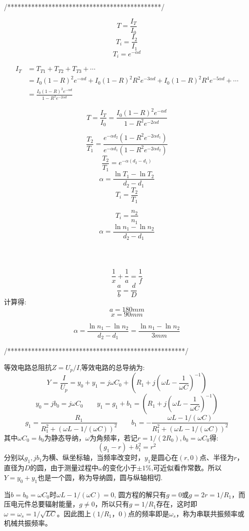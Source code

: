 \documentclass[UTF8]{article}
\begin{document}
{	/*********************************************/
	
	$$T = \frac{I_T}{I_0}$$
	$$T_i = \frac{I_2}{I_1}$$
	$$T_i = e^{-\alpha d}$$
	
	\begin{equation}
	\begin{aligned}
	I_T &= T_{T1} + T_{T2} + T_{T3}+\cdots\\ &= I_0(1-R)^2e^{-\alpha d} + I_0(1-R)^2R^2e^{-3\alpha d}+I_0(1-R)^2R^4e^{-5\alpha d}+\cdots\\ &= \frac{I_0(1-R)^2e^{-\alpha d}}{1-R^2e^{-2\alpha d}}
	\end{aligned}
	\end{equation}
	
	$$T = \frac{I_T}{I_0} = \frac{I_0(1-R)^2e^{-\alpha d}}{1-R^2e^{-2\alpha d}}$$
	
	$$\frac{T_2}{T_1} = \frac{e^{-\alpha d_2}(1-R^2e^{-2\alpha d_1})}{e^{-\alpha d_1}(1-R^2e^{-2\alpha d_2})}$$
	$$\frac{T_2}{T_1} = e^{-\alpha(d_2-d_1)}$$
	$$\alpha = \frac{\ln T_1 - \ln T_2}{d_2 - d_1}$$
	$$T_i = \frac{T_2}{T_1}$$
	
	$$T_i = \frac{n_2}{n_1}$$
	$$\alpha = \frac{\ln n_1 - \ln n_2}{d_2 - d_1}$$
	\\\\\\
	$$\frac{1}{x} + \frac{1}{a} = \frac{1}{f}$$
	$$\frac{a}{b} = \frac{d}{D}$$
	计算得:
	$$a = 180mm$$
	$$x = 90mm$$
	
	$$\alpha = \frac{\ln n_1 - \ln n_2}{d_2-d_1} = \frac{\ln n_1 - \ln n_2}{3mm}$$
	
	/****************************************************/
	
	
	等效电路总阻抗$Z = U_p/I$,等效电路的总导纳为:
	$$Y = \frac{I}{U_p} = y_0+y_1 = j\omega C_0 + \left(R_1 + j\left(\omega L - \frac{1}{\omega C}\right)^{-1}\right)$$
	$$y_0 = jb_0 = j\omega C_0\qquad y_1 = g_1 + b_1 = \left(R_1 + j\left(\omega L - \frac{1}{\omega C}\right)^{-1}\right)$$
	$$g_1 = \frac{R_1}{R_1^2 + (\omega L - 1/(\omega C))^2}\qquad b_1 = -\frac{\omega L - 1/(\omega C)}{R_1^2 + (\omega L - 1/(\omega C))^2}$$
	其中$\omega C_0 = b_0$为静态导纳，$\omega$为角频率，若记$r = 1/(2R_0), b_0 = \omega C_0$得:
	$$(g_1 - r) + b_1^2 = r^2$$
	分别以$g_1, jb_1$为横、纵坐标轴，当频率改变时，$y_1$是圆心在$(r, 0)$点、半径为$r$，直径为$D$的圆，由于测量过程中$\omega$的变化小于$\pm1\%$,可近似看作常数。所以$Y=y_0+y_1$也是一个圆，称为导纳圆，圆与纵轴相切.
	
	
	当$b = b_0 = \omega C_0$时$\omega L - 1/(\omega C) = 0$, 圆方程的解只有$g=0$或$g=2r=1/R_1$，而压电元件总要辐射能量，$g\neq0$，所以只有$g=1/R_1$存在，这时即$\omega = \omega_s = 1/\sqrt{LC}$。因此图上$(1/R_1，0)$点的频率即是$\omega_s$，称为串联共振频率或机械共振频率。
	
}
\end{document}
